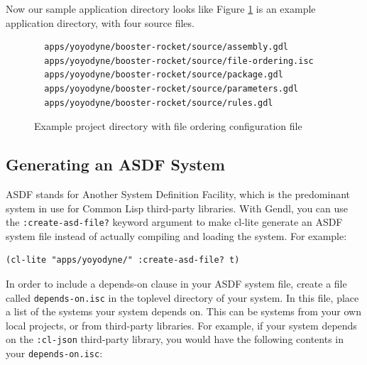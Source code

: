 \documentclass [11pt]{book}
\begin{document}
Now our sample application directory looks like Figure 
\ref{fig:yoyodyne-with-file-ordering-isc} is an example application directory, with four source files.


\begin{figure}
\begin{lrbox}{\boxedverb}
\begin{minipage}{\linewidth}

\begin{verbatim}
  apps/yoyodyne/booster-rocket/source/assembly.gdl
  apps/yoyodyne/booster-rocket/source/file-ordering.isc
  apps/yoyodyne/booster-rocket/source/package.gdl
  apps/yoyodyne/booster-rocket/source/parameters.gdl
  apps/yoyodyne/booster-rocket/source/rules.gdl
\end{verbatim}
\end{minipage}
\end{lrbox}
\fbox{\usebox{\boxedverb}}

\caption{Example project directory with file ordering configuration file}

\label{fig:yoyodyne-with-file-ordering-isc}

\end{figure}


\subsection{Generating an ASDF System}

\label{subsec:generatinganasdfsystem}



ASDF stands for Another System Definition Facility, which
	is the predominant system in use for Common Lisp third-party
	libraries. With Gendl, you can use the \texttt{:create-asd-file?} keyword argument to make cl-lite generate an ASDF system
file instead of actually compiling and loading the system. For example: 

\begin{verbatim}(cl-lite "apps/yoyodyne/" :create-asd-file? t)
\end{verbatim}



In order to include a depends-on clause in your ASDF system file, create a file called \texttt{depends-on.isc} in the toplevel directory of your system. In this file,
place a list of the systems your system depends on. This can be
systems from your own local projects, or from third-party libraries.
For example, if your system depends on the \texttt{:cl-json} third-party library, you would have the following contents in your \texttt{depends-on.isc}: 
\end{document}
